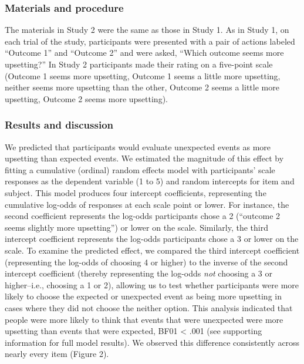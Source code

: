 \documentclass[9pt,twocolumn,twoside,lineno]{pnas-new}
\begin{document}
\subsubsection*{Materials and procedure}\label{s2-materials-procedure}

The materials in Study 2 were the same as those in Study 1. As in Study
1, on each trial of the study, participants were presented with a pair
of actions labeled ``Outcome 1'' and ``Outcome 2'' and were asked,
``Which outcome seems more upsetting?'' In Study 2 participants made
their rating on a five-point scale (Outcome 1 seems more upsetting,
Outcome 1 seems a little more upsetting, neither seems more upsetting
than the other, Outcome 2 seems a little more upsetting, Outcome 2 seems
more upsetting).

\subsubsection*{Results and discussion}\label{s2-results}

We predicted that participants would evaluate unexpected events as more
upsetting than expected events. We estimated the magnitude of this
effect by fitting a cumulative (ordinal) random effects model with
participants' scale responses as the dependent variable (1 to 5) and
random intercepts for item and subject. This model produces four
intercept coefficients, representing the cumulative log-odds of
responses at each scale point or lower. For instance, the second
coefficient represents the log-odds participants chose a 2 (``outcome 2
seems slightly more upsetting'') or lower on the scale. Similarly, the
third intercept coefficient represents the log-odds participants chose a
3 or lower on the scale. To examine the predicted effect, we compared
the third intercept coefficient (representing the log-odds of choosing 4
or higher) to the inverse of the second intercept coefficient (thereby
representing the log-odds \emph{not} choosing a 3 or higher--i.e.,
choosing a 1 or 2), allowing us to test whether participants were more
likely to choose the expected or unexpected event as being more
upsetting in cases where they did not choose the neither option. This
analysis indicated that people were more likely to think that events
that were unexpected were more upsetting than events that were expected,
BF01 \textless{} .001 (see supporting information for full model
results). We observed this difference consistently across nearly every
item (Figure 2).
\end{document}
